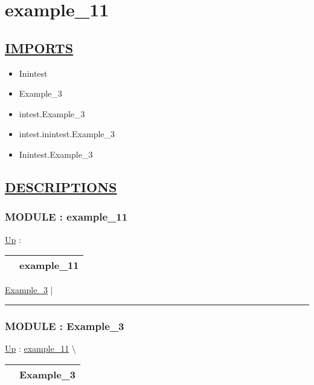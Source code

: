 \chapter*{example\_11}
\hypertarget{ecldoc:toc:example_11}{}

\section*{\underline{IMPORTS}}
\begin{itemize}
\item Inintest
\item Example\_3
\item intest.Example\_3
\item intest.inintest.Example\_3
\item Inintest.Example\_3
\end{itemize}

\section*{\underline{DESCRIPTIONS}}
\subsection*{MODULE : example\_11}
\hypertarget{ecldoc:example_11}{}
\hyperlink{ecldoc:toc:root}{Up} :

{\renewcommand{\arraystretch}{1.5}
\begin{tabularx}{\textwidth}{|>{\raggedright\arraybackslash}l|X|}
\hline
\hspace{0pt} & example\_11 \\
\hline
\end{tabularx}
}

\par


\hyperlink{ecldoc:Inintest.Example_3}{Example\_3}  |

\rule{\linewidth}{0.5pt}

\subsection*{MODULE : Example\_3}
\hypertarget{ecldoc:Inintest.Example_3}{}
\hyperlink{ecldoc:example_11}{Up} :
\hspace{0pt} \hyperlink{ecldoc:example_11}{example_11} \textbackslash 

{\renewcommand{\arraystretch}{1.5}
\begin{tabularx}{\textwidth}{|>{\raggedright\arraybackslash}l|X|}
\hline
\hspace{0pt} & Example\_3 \\
\hline
\end{tabularx}
}

